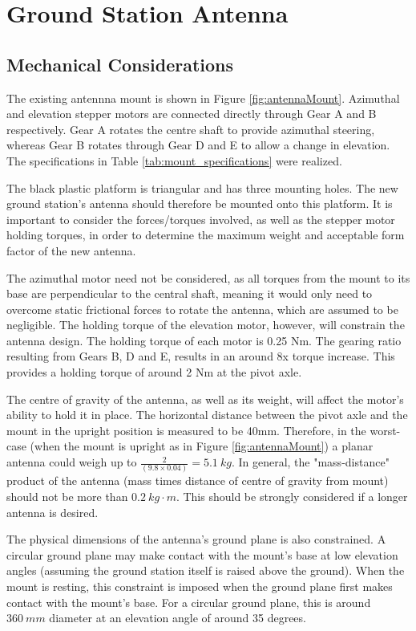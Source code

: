 \graphicspath{{./figures}}

\section{Ground Station Antenna}
\subsection{Mechanical Considerations}

The existing antennna mount is shown in Figure \ref{fig:antennaMount}. Azimuthal and elevation stepper motors are connected directly through Gear A and B respectively. Gear A rotates the centre shaft to provide azimuthal steering, whereas Gear B rotates through Gear D and E to allow a change in elevation. The 
specifications in Table \ref{tab:mount_specifications} were realized.

The black plastic platform is triangular and has three mounting holes. The new ground station's antenna should therefore be mounted onto this platform. It is important to consider the forces/torques involved, as well as the stepper motor holding torques, in order to determine the maximum weight and acceptable form factor of the new antenna.

The azimuthal motor need not be considered, as all torques from the mount to its base are perpendicular to the central shaft, meaning it would only need to overcome static frictional forces to rotate the antenna, which are assumed to be negligible. The holding torque of the elevation motor, however, will constrain the antenna design. The holding torque of each motor is 0.25 Nm. The gearing ratio resulting from Gears B, D and E, results in an around 8x torque increase. This provides a holding torque of around 2 Nm at the pivot axle.

The centre of gravity of the antenna, as well as its weight, will affect the motor's ability to hold it in place. The horizontal distance between the pivot axle and the mount in the upright position is measured to be 40mm. Therefore, in the worst-case (when the mount is upright as in Figure \ref{fig:antennaMount}) a planar antenna could weigh up to $\frac{2}{(9.8 \times 0.04)} = \SI{5.1}{kg}$. In general, the "mass-distance" product of the antenna (mass times distance of centre of gravity from mount) should not be more than $\SI{0.2}{kg \cdot m}$. This should be strongly considered if a longer antenna is desired.

The physical dimensions of the antenna's ground plane is also constrained. A circular ground plane may make contact with the mount's base at low elevation angles (assuming the ground station itself is raised above the ground). When the mount is resting, this constraint is imposed when the ground plane first makes contact with the mount's base. For a circular ground plane, this is around $\SI{360}{mm}$ diameter at an elevation angle of around 35 degrees.

